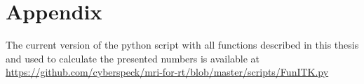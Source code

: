 \chapter*{Appendix}

The current version of the python script with all functions described in this thesis and used to calculate the presented numbers is available at \url{https://github.com/cyberspeck/mri-for-rt/blob/master/scripts/FunITK.py}